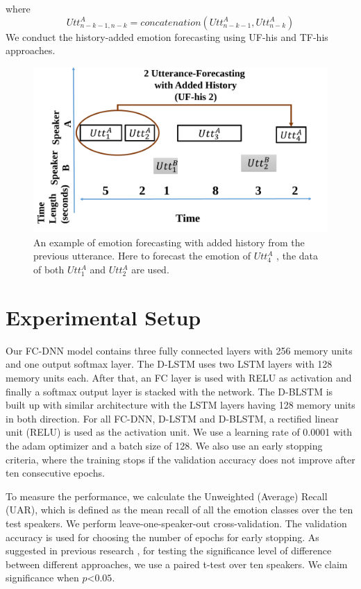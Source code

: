 where \[Utt_{n-k-1,n-k}^A=concatenation(Utt_{n-k-1}^A, Utt_{n-k}^A)\]
We conduct the history-added emotion forecasting using UF-his and TF-his approaches.
\begin{figure}
\centering
\includegraphics[width=.6\linewidth]{Chapters/his.pdf}
\caption[An example of emotion forecasting with added history from the previous utterance]{An example of emotion forecasting with added history from the previous utterance. Here to forecast the emotion of $Utt_{4}^A$ , the data of both $Utt_{1}^A$ and $Utt_{2}^A$  are used.  }
\label{fig:history}
\end{figure}

\newpage
 \section{Experimental Setup }
Our FC-DNN model contains three fully connected layers with 256 memory units and one output softmax layer.  The D-LSTM uses two LSTM layers with 128 memory units each. After that, an FC layer is used with RELU as activation and finally a softmax output layer is stacked with the network. The D-BLSTM is built up with similar architecture with the LSTM layers having 128 memory units in both direction.   For all FC-DNN, D-LSTM and D-BLSTM, a rectified linear unit (RELU) is used as the activation unit. We use a learning rate of 0.0001 with the adam \cite{adam} optimizer and a batch size of 128. We also use an early stopping criteria, where the training stops if the validation accuracy does not improve after ten consecutive epochs. 

To measure the performance, we calculate the Unweighted (Average) Recall (UAR), which is defined as the mean recall of all the emotion classes over the ten test speakers. We perform leave-one-speaker-out cross-validation. The validation accuracy is used for choosing the number of epochs for early stopping. As suggested in previous research \cite{significance} , for testing the significance level of difference between different approaches, we use a paired t-test over ten speakers. We claim significance when $p$\textless$0.05$.


